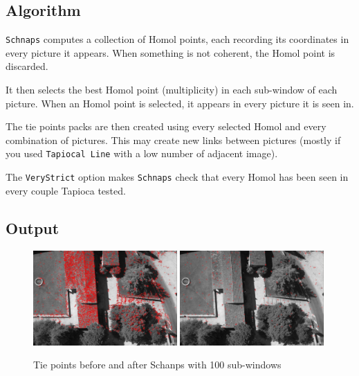 \subsection{Algorithm}
{\tt Schnaps} computes a collection of Homol points, each recording its coordinates in every picture it appears.
When something is not coherent, the Homol point is discarded.

It then selects the best Homol point (multiplicity) in each sub-window of each picture.
When an Homol point is selected, it appears in every picture it is seen in.

The tie points packs are then created using every selected Homol and every combination of pictures.
This may create new links between pictures (mostly if you used {\tt Tapiocal Line} with a low number of adjacent image).

The {\tt VeryStrict} option makes {\tt Schnaps} check that every Homol has been seen in every couple Tapioca tested.


\subsection{Output}

\begin{figure}
\begin{center}
\includegraphics[width=0.49\textwidth]{FIGS/Schnaps/Schnaps_homol_all.jpg}
\includegraphics[width=0.49\textwidth]{FIGS/Schnaps/Schnaps_homol_100.jpg}
\end{center}
\caption{Tie points before and after Schanps with 100 sub-windows}
\end{figure}

